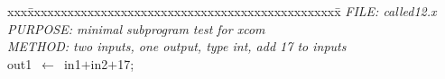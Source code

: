 \documentclass{report}
\begin{document}
\pagestyle{empty}
\begin{tabbing}
xxx\=xxxxxxxxxxxxxxxxxxxxxxxxxxxxxxxxxxxxxxxxxxxxxxx\=\kill
{\tt{}}{\em{} FILE:    called12.x
}\\
{\tt{}}{\em{} PURPOSE: minimal subprogram test for xcom
}\\
{\tt{}}{\em{} METHOD:  two inputs, one output, type int, add 17 to inputs
}\\
out1\ $\leftarrow$\ in1$+$in2$+$17;\\
\end{tabbing}
\end{document}
